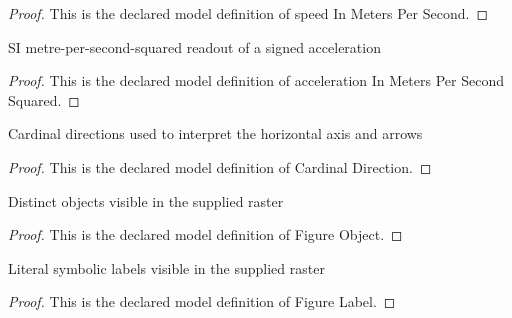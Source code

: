 \begin{proof}
  This is the declared model definition of speed In Meters Per Second.
\end{proof}
\begin{definition}
  \label{def:physics:phyx-mini-0793:phyxminiproblems-problemphyxmini0793-accelerationinmeterspersecondsquared}
  SI metre-per-second-squared readout of a signed acceleration
\end{definition}
\begin{proof}
  This is the declared model definition of acceleration In Meters Per Second Squared.
\end{proof}
\begin{definition}
  \label{def:physics:phyx-mini-0793:phyxminiproblems-problemphyxmini0793-cardinaldirection}
  Cardinal directions used to interpret the horizontal axis and arrows
\end{definition}
\begin{proof}
  This is the declared model definition of Cardinal Direction.
\end{proof}
\begin{definition}
  \label{def:physics:phyx-mini-0793:phyxminiproblems-problemphyxmini0793-figureobject}
  Distinct objects visible in the supplied raster
\end{definition}
\begin{proof}
  This is the declared model definition of Figure Object.
\end{proof}
\begin{definition}
  \label{def:physics:phyx-mini-0793:phyxminiproblems-problemphyxmini0793-figurelabel}
  Literal symbolic labels visible in the supplied raster
\end{definition}
\begin{proof}
  This is the declared model definition of Figure Label.
\end{proof}
